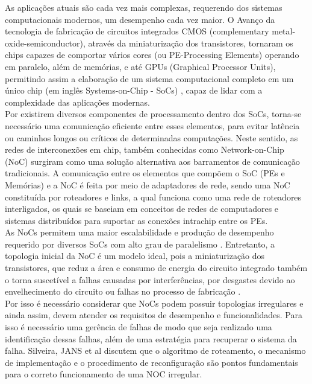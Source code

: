 \documentclass[conference]{IEEEtran}
\begin{document}
	
	As aplicações atuais são cada vez mais complexas, requerendo dos sistemas computacionais modernos, um desempenho cada vez maior. O Avanço da tecnologia de fabricação de circuitos integrados CMOS (complementary metal-oxide-semiconductor), através da miniaturização dos transistores, tornaram os chips capazes de comportar vários cores (ou PE-Processing Elements) operando em paralelo\cite{b2}, além de memórias, e até GPUs (Graphical Processor Units), permitindo assim a elaboração de um sistema computacional completo em um único chip (em inglês Systems-on-Chip - SoCs) \cite{b1}, capaz de lidar com a complexidade das aplicações modernas.  \\ 
	Por existirem diversos componentes de processamento dentro dos SoCs, torna-se necessário uma comunicação eficiente entre esses elementos, para evitar latência ou caminhos longos ou críticos de determinadas computações. Neste sentido, as redes de interconexões em chip, também conhecidas como Network-on-Chip (NoC) surgiram como uma solução alternativa aos barramentos de comunicação tradicionais. A comunicação entre os elementos que compõem o SoC (PEs e Memórias) e a NoC é feita por meio de adaptadores de rede, sendo uma NoC constituída por roteadores e links, a qual funciona como uma rede de roteadores interligados, os quais se baseiam em conceitos de redes de computadores e sistemas distribuídos para suportar as conexões intrachip entre os PEs. \\
	As NoCs permitem uma maior escalabilidade e produção de  desempenho requerido por diversos SoCs com alto grau de paralelismo \cite{b3}. Entretanto, a topologia inicial da NoC é um modelo ideal, pois a miniaturização dos transistores, que reduz a área e consumo de energia do circuito integrado também o torna suscetível a falhas causadas por interferências, por desgastes devido ao envelhecimento do circuito ou falhas no processo de fabricação \cite{b4}.\\ Por isso é necessário considerar que NoCs podem possuir topologias irregulares e ainda assim, devem atender os requisitos de desempenho e funcionalidades. Para isso é necessário uma gerência de falhas de modo que seja realizado uma identificação dessas falhas, além de uma estratégia para recuperar o sistema da falha. Silveira, JANS et al \cite{b5} discutem que o algoritmo de roteamento, o mecanismo de implementação e o procedimento de reconfiguração são pontos fundamentais para o correto funcionamento de uma NOC irregular.\\
	
\end{document}
